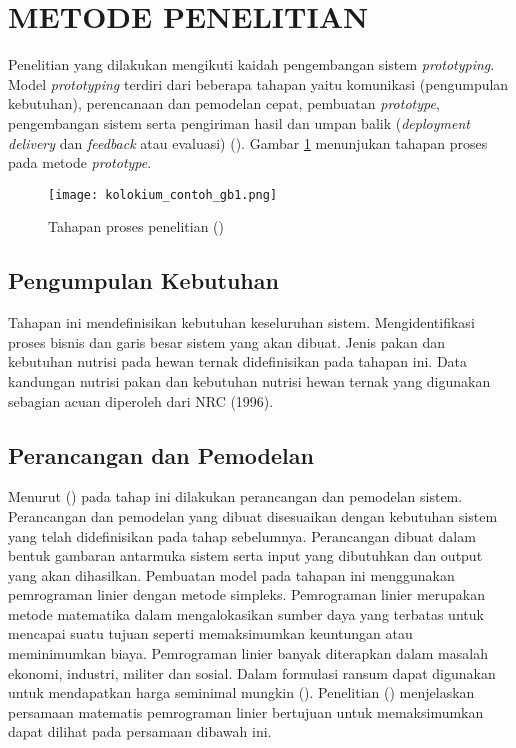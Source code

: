 \section*{METODE PENELITIAN}

Penelitian yang dilakukan mengikuti kaidah pengembangan sistem \textit{prototyping}. Model \textit{prototyping} terdiri dari beberapa tahapan yaitu komunikasi (pengumpulan kebutuhan), perencanaan dan pemodelan cepat, pembuatan \textit{prototype}, pengembangan sistem serta pengiriman hasil dan umpan balik (\textit{deployment delivery} dan \textit{feedback} atau evaluasi) (\cite{Pressman2010}). Gambar \ref{fig:tahapan} menunjukan tahapan proses pada metode \textit{prototype}.

\begin{figure}[h!] %
\centering
\texttt{[image: kolokium\_contoh\_gb1.png]}
\caption{Tahapan proses penelitian (\cite{Pressman2010})}
\label{fig:tahapan}
\end{figure}

\subsection*{Pengumpulan Kebutuhan}

Tahapan ini mendefinisikan kebutuhan keseluruhan sistem. Mengidentifikasi proses bisnis dan garis besar sistem yang akan dibuat. Jenis pakan dan kebutuhan nutrisi pada hewan ternak didefinisikan pada tahapan ini. Data kandungan nutrisi pakan dan kebutuhan nutrisi hewan ternak yang digunakan sebagian acuan diperoleh dari NRC (1996).

\subsection*{Perancangan dan Pemodelan}

Menurut \citeauthor{Pressman2010} (\cite*{Pressman2010}) pada tahap ini dilakukan perancangan dan pemodelan sistem. Perancangan dan pemodelan yang dibuat disesuaikan dengan kebutuhan sistem yang telah didefinisikan pada tahap sebelumnya. Perancangan dibuat dalam bentuk gambaran antarmuka sistem serta input yang dibutuhkan dan output yang akan dihasilkan. Pembuatan model pada tahapan ini menggunakan pemrograman linier dengan metode simpleks. Pemrograman linier merupakan metode matematika dalam mengalokasikan sumber daya yang terbatas untuk mencapai suatu tujuan seperti memaksimumkan keuntungan atau meminimumkan biaya. Pemrograman linier banyak diterapkan dalam masalah ekonomi, industri, militer dan sosial. Dalam formulasi ransum dapat digunakan untuk mendapatkan harga seminimal mungkin (\cite{Wirdasari2009}). Penelitian \citeauthor{Hidayat2013} (\cite*{Hidayat2013}) menjelaskan persamaan matematis pemrograman linier bertujuan untuk memaksimumkan dapat dilihat pada persamaan dibawah ini.\\

